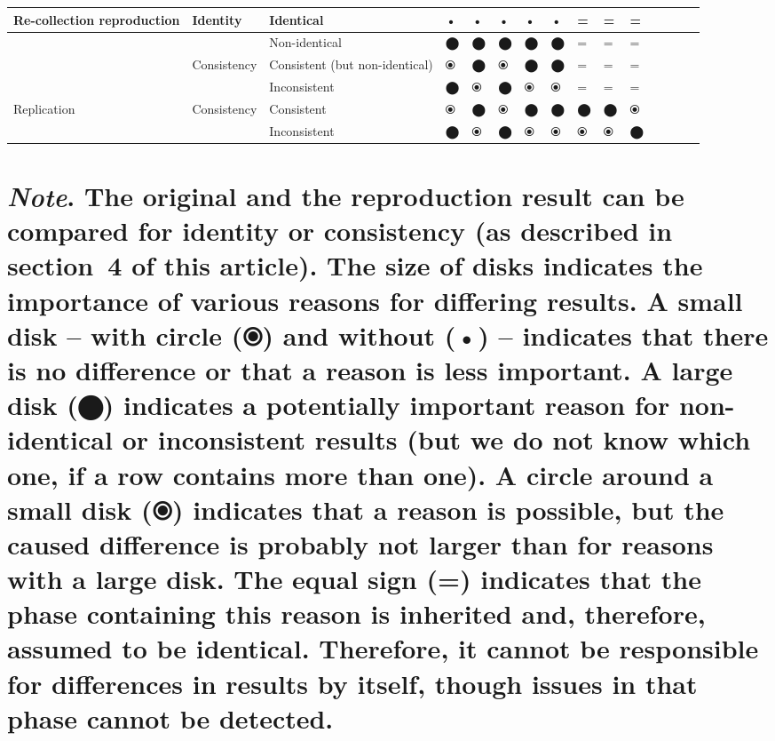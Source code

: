\documentclass[authordate, empirical]{jote-new-article}
\begin{document}
\begin{table}
\begin{tabularx}{\linewidth}{@{} l l l l l l l l l l l l l l l @{}}
			\hline Re-collection reproduction & Identity & Identical & • & • & • & • &
			• & = & = & = \\

			\hline  &  & Non-identical & ⬤ & ⬤ & ⬤ & ⬤ & ⬤ & = & = & = \\

			\hline  & Consistency & Consistent (but non-identical) & ⦿ & ⬤ & ⦿ & ⬤ & ⬤
			& = & = & = \\

			\hline  &  & Inconsistent & ⬤ & ⦿ & ⬤ & ⦿ & ⦿ & = & = & = \\

			\hline Replication & Consistency & Consistent & ⦿ & ⬤ & ⦿ & ⬤ & ⬤ & ⬤ & ⬤ &
			⦿ \\

			\hline  &  & Inconsistent & ⬤ & ⦿ & ⬤ & ⦿ & ⦿ & ⦿ & ⦿ & ⬤ \\


		\end{tabularx}
	\end{table}

	\section{\emph{Note}. The original and the reproduction result can be compared for identity or consistency (as described in section 4 of this article). The size of disks indicates the importance of various reasons for differing results. A small disk -- with circle (⦿) and without (•) -- indicates that there is no difference or that a reason is less important. A large disk (⬤) indicates a potentially important reason for non-identical or inconsistent results (but we do not know which one, if a row contains more than one). A circle around a small disk (⦿) indicates that a reason is possible, but the caused difference is probably not larger than for reasons with a large disk. The equal sign (=) indicates that the phase containing this reason is inherited and, therefore, assumed to be identical. Therefore, it cannot be responsible for differences in results by itself, though issues in that phase cannot be detected.}
\end{document}
